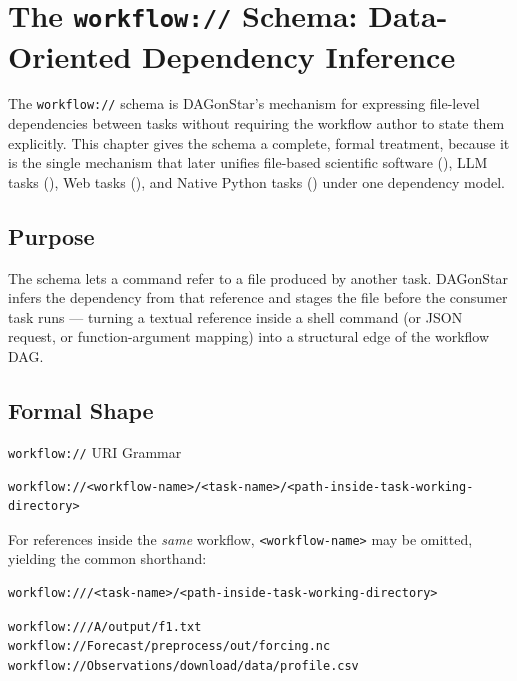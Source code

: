 \chapter{The \texttt{workflow://} Schema: Data-Oriented Dependency Inference}
\label{ch:schema}

The \texttt{workflow://} schema is DAGonStar's mechanism for expressing
file-level dependencies between tasks without requiring the workflow author
to state them explicitly. This chapter gives the schema a complete, formal
treatment, because it is the single mechanism that later unifies file-based
scientific software (), LLM tasks
(), Web tasks (), and Native Python
tasks () under one dependency model.

\section{Purpose}

The schema lets a command refer to a file produced by another task. DAGonStar
infers the dependency from that reference and stages the file before the
consumer task runs --- turning a textual reference inside a shell command (or
JSON request, or function-argument mapping) into a structural edge of the
workflow DAG.

\section{Formal Shape}

\begin{definitionbox}{\texttt{workflow://} URI Grammar}
\begin{lstlisting}[basicstyle=\ttfamily\small, frame=none]
workflow://<workflow-name>/<task-name>/<path-inside-task-working-directory>
\end{lstlisting}
For references inside the \emph{same} workflow, \texttt{<workflow-name>} may
be omitted, yielding the common shorthand:
\begin{lstlisting}[basicstyle=\ttfamily\small, frame=none]
workflow:///<task-name>/<path-inside-task-working-directory>
\end{lstlisting}
\end{definitionbox}

\begin{lstlisting}[caption={Representative \texttt{workflow://} references.}]
workflow:///A/output/f1.txt
workflow://Forecast/preprocess/out/forcing.nc
workflow://Observations/download/data/profile.csv
\end{lstlisting}

